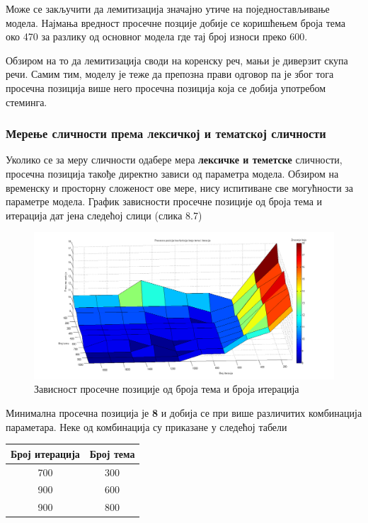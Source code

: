 Може се закључити да лемитизација значајно утиче на поједностављивање модела. Најмања вредност просечне позције добије се коришћењем броја тема око  470 за разлику од основног модела где тај број износи преко 600.

Обзиром на то да лемитизација своди на коренску реч, мањи је диверзит скупа речи. Самим тим, моделу је теже да препозна прави одговор па је због тога просечна позиција више него просечна позиција која се добија употребом стеминга.



\subsubsection{Мерење сличности према лексичкој и тематској сличности}
	
Уколико се за меру сличности одабере мера  \textbf{лексичке и теметске} сличности, просечна позиција такође директно зависи од параметра модела. Обзиром на временску и просторну сложеност ове мере, нису испитиване све могућности за параметре модела. График зависности просечне позиције од броја тема и итерација дат јена следећој слици (слика 8.7)

		\begin{figure}[H]
    \centering
   \includegraphics[scale=0.3]{./Slike/distLemNoSyn.png} 
	\caption{Зависност просечне позиције од броја тема и броја итерација}
	\label{fig:slika1}
\end{figure}

Минимална просечна позиција је \textbf{8} и добија се при више различитих комбинација параметара. Неке од комбинација су приказане у следећој табели

\begin{center}
\begin{tabular}{|c|c|}
\hline
Број итерација & Број тема \\
\hline\hline
700 & 300 \\
900 & 600 \\
900 & 800 \\
\hline
\end{tabular}

\end{center}




